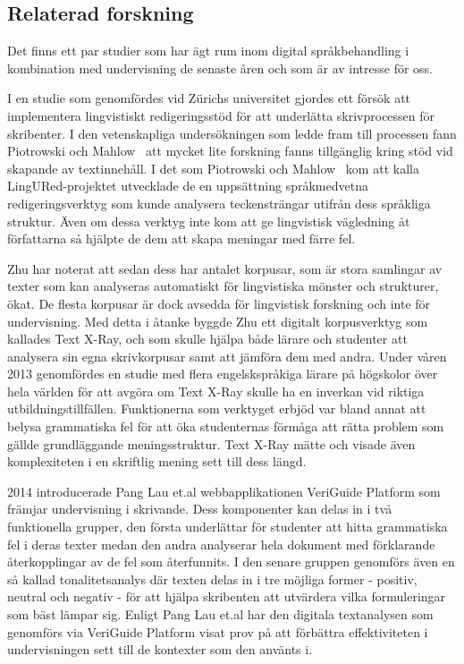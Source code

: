 \documentclass[swedish]{maucsthesis}
\begin{document}
\subsection{Relaterad forskning}\label{relateradforskning}

Det finns ett par studier som har ägt rum inom digital språkbehandling i kombination med undervisning de senaste åren och som är av intresse för oss.

I en studie som genomfördes vid Zürichs universitet gjordes ett försök att
implementera lingvistiskt redigeringsstöd för att underlätta skrivprocessen för
skribenter. I den vetenskapliga undersökningen som ledde fram till processen
fann Piotrowski och Mahlow~\cite{Piotrowski:2009} att mycket lite forskning fanns tillgänglig kring stöd vid skapande av textinnehåll. I det som Piotrowski och Mahlow~\cite{Piotrowski:2009} kom att
kalla LingURed-projektet utvecklade de en uppsättning språkmedvetna
redigeringsverktyg som kunde analysera teckensträngar utifrån dess språkliga
struktur. Även om dessa verktyg inte kom att ge lingvistisk vägledning åt
författarna så hjälpte de dem att skapa meningar med färre fel.

Zhu\cite{zhu:2015} har noterat att sedan dess har antalet korpusar, som är stora
samlingar av texter som kan analyseras automatiskt för lingvistiska mönster och
strukturer, ökat. De flesta korpusar är dock avsedda för lingvistisk forskning och
inte för undervisning. Med detta i åtanke byggde Zhu \cite{zhu:2015} ett
digitalt korpusverktyg som kallades Text X-Ray, och som skulle hjälpa både lärare och
studenter att analysera sin egna skrivkorpusar samt att jämföra dem med andra.
Under våren 2013 genomfördes en studie med flera engelskspråkiga lärare på
högskolor över hela världen för att avgöra om Text X-Ray skulle ha en inverkan
vid riktiga utbildningstillfällen. Funktionerna som verktyget erbjöd var bland
annat att belysa grammatiska fel för att öka studenternas förmåga att rätta problem
som gällde grundläggande meningsstruktur. Text X-Ray mätte och visade även
komplexiteten i en skriftlig mening sett till dess längd.

2014 introducerade Pang Lau et.al \cite{lau:2014} webbapplikationen VeriGuide Platform som främjar undervisning i skrivande. Dess komponenter kan delas in i två funktionella grupper, den första underlättar för studenter att hitta grammatiska fel i deras texter medan den andra analyserar hela dokument med förklarande återkopplingar av de fel som återfunnits. I den senare gruppen genomförs även en så kallad tonalitetsanalys där texten delas in i tre möjliga former -  positiv, neutral och negativ - för att hjälpa skribenten att utvärdera vilka formuleringar som bäst lämpar sig.
Enligt Pang Lau et.al har den digitala textanalysen som genomförs via VeriGuide Platform visat prov på att förbättra effektiviteten i undervisningen sett till de kontexter som den använts i.
\end{document}
